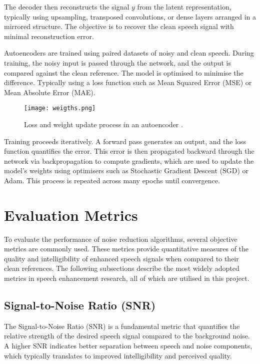 The decoder then reconstructs the signal \(y\) from the latent representation, typically using upsampling, transposed convolutions, or dense layers arranged in a mirrored structure. The objective is to recover the clean speech signal with minimal reconstruction error.

Autoencoders are trained using paired datasets of noisy and clean speech. During training, the noisy input is passed through the network, and the output is compared against the clean reference. The model is optimised to minimise the difference. Typically using a loss function such as Mean Squared Error (MSE) or Mean Absolute Error (MAE).

\begin{figure}[h]
    \centering
    \texttt{[image: weigths.png]}
    \caption{\label{fig:weigths} Loss and weight update process in an autoencoder \cite{epoch2021}.}
\end{figure}

Training proceeds iteratively. A forward pass generates an output, and the loss function quantifies the error. This error is then propagated backward through the network via backpropagation to compute gradients, which are used to update the model’s weights using optimisers such as Stochastic Gradient Descent (SGD) or Adam. This process is repeated across many epochs until convergence.


\section{Evaluation Metrics}
\label{sec:evaluation_metrics}

To evaluate the performance of noise reduction algorithms, several objective metrics are commonly used. These metrics provide quantitative measures of the quality and intelligibility of enhanced speech signals when compared to their clean references. The following subsections describe the most widely adopted metrics in speech enhancement research, all of which are utilised in this project.

\subsection{Signal-to-Noise Ratio (SNR)}
\label{subsec:snr}

The Signal-to-Noise Ratio (SNR) is a fundamental metric that quantifies the relative strength of the desired speech signal compared to the background noise. A higher SNR indicates better separation between speech and noise components, which typically translates to improved intelligibility and perceived quality.

